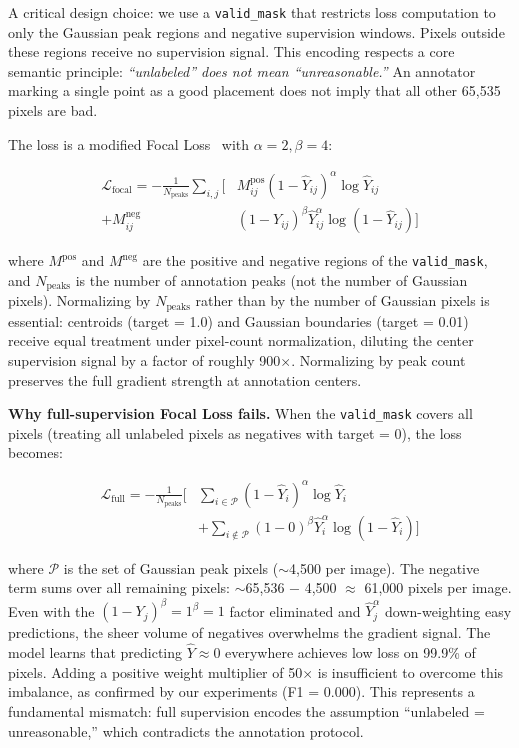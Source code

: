\documentclass[10pt,twocolumn]{article}
\begin{document}
A critical design choice: we use a \texttt{valid\_mask} that restricts loss computation to only the Gaussian peak regions and negative supervision windows. Pixels outside these regions receive no supervision signal. This encoding respects a core semantic principle: \textit{``unlabeled'' does not mean ``unreasonable.''} An annotator marking a single point as a good placement does not imply that all other 65,535 pixels are bad.

The loss is a modified Focal Loss~\cite{focal} with $\alpha=2, \beta=4$:

\begin{equation}
\begin{split}
\mathcal{L}_{\text{focal}} = -\frac{1}{N_{\text{peaks}}} \sum_{i,j} \Big[
    & M_{ij}^{\text{pos}} (1-\hat{Y}_{ij})^\alpha \log \hat{Y}_{ij} \\
     + M_{ij}^{\text{neg}} & (1-Y_{ij})^\beta \hat{Y}_{ij}^\alpha \log(1-\hat{Y}_{ij})
\Big]
\end{split}
\end{equation}

where $M^{\text{pos}}$ and $M^{\text{neg}}$ are the positive and negative regions of the \texttt{valid\_mask}, and $N_{\text{peaks}}$ is the number of annotation peaks (not the number of Gaussian pixels). Normalizing by $N_{\text{peaks}}$ rather than by the number of Gaussian pixels is essential: centroids (target = 1.0) and Gaussian boundaries (target = 0.01) receive equal treatment under pixel-count normalization, diluting the center supervision signal by a factor of roughly 900$\times$. Normalizing by peak count preserves the full gradient strength at annotation centers.

\textbf{Why full-supervision Focal Loss fails.} When the \texttt{valid\_mask} covers all pixels (treating all unlabeled pixels as negatives with target = 0), the loss becomes:

\begin{equation}
\begin{split}
\mathcal{L}_{\text{full}} = -\frac{1}{N_{\text{peaks}}} \bigg[
    & \sum_{i\in\mathcal{P}} (1-\hat{Y}_i)^\alpha \log \hat{Y}_i \\
    & + \sum_{i\notin\mathcal{P}} (1-0)^\beta \hat{Y}_i^\alpha \log(1-\hat{Y}_i) \bigg]
\end{split}
\end{equation}

where $\mathcal{P}$ is the set of Gaussian peak pixels ($\sim$4,500 per image). The negative term sums over all remaining pixels: $\sim$65,536 $-$ 4,500 $\approx$ 61,000 pixels per image. Even with the $(1-Y_j)^\beta = 1^\beta = 1$ factor eliminated and $\hat{Y}_j^\alpha$ down-weighting easy predictions, the sheer volume of negatives overwhelms the gradient signal. The model learns that predicting $\hat{Y} \approx 0$ everywhere achieves low loss on 99.9\% of pixels. Adding a positive weight multiplier of 50$\times$ is insufficient to overcome this imbalance, as confirmed by our experiments (F1 = 0.000). This represents a fundamental mismatch: full supervision encodes the assumption ``unlabeled = unreasonable,'' which contradicts the annotation protocol.
\end{document}
